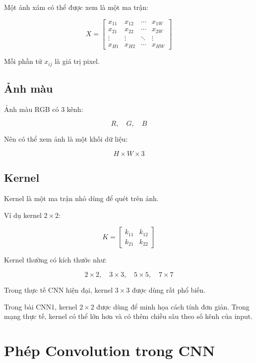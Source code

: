 \documentclass[12pt,a4paper]{report}
\begin{document}
Một ảnh xám có thể được xem là một ma trận:

\[
    X =
    \begin{bmatrix}
    x_{11} & x_{12} & \cdots & x_{1W}\\
    x_{21} & x_{22} & \cdots & x_{2W}\\
    \vdots & \vdots & \ddots & \vdots\\
    x_{H1} & x_{H2} & \cdots & x_{HW}
    \end{bmatrix}
\]

Mỗi phần tử $x_{ij}$ là giá trị pixel.

\section{Ảnh màu}

Ảnh màu RGB có 3 kênh:

\[
    R,\quad G,\quad B
\]

Nên có thể xem ảnh là một khối dữ liệu:

\[
    H \times W \times 3
\]

\section{Kernel}

Kernel là một ma trận nhỏ dùng để quét trên ảnh.

Ví dụ kernel $2 \times 2$:

\[
    K =
    \begin{bmatrix}
    k_{11} & k_{12}\\
    k_{21} & k_{22}
    \end{bmatrix}
\]

Kernel thường có kích thước như:

\[
    2 \times 2,\quad 3 \times 3,\quad 5 \times 5,\quad 7 \times 7
\]

Trong thực tế CNN hiện đại, kernel $3 \times 3$ được dùng rất phổ biến.

\begin{luuy}
Trong bài CNN1, kernel $2 \times 2$ được dùng để minh họa cách tính đơn giản. Trong mạng thực tế, kernel có thể lớn hơn và có thêm chiều sâu theo số kênh của input.
\end{luuy}

\chapter{Phép Convolution trong CNN}
\end{document}
